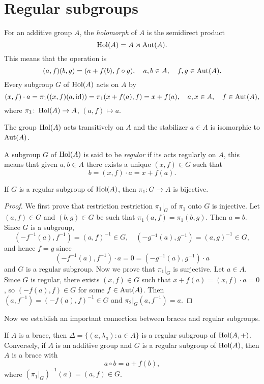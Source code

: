 \chapter{Regular subgroups}

For an additive group $A$, the \emph{holomorph} of $A$ is the semidirect product 
\[
	\operatorname{Hol}(A)=A\rtimes\operatorname{Aut}(A).
\]
This means that the operation is 
\[
	(a,f)(b,g)=(a+f(b),f\circ g),\quad
	a,b\in A,\quad
	f,g\in\operatorname{Aut}(A).
\]
Every subgroup $G$ of $\operatorname{Hol}(A)$ acts on $A$ by 
\[
	(x,f)\cdot a=\pi_1( (x,f)(a,\operatorname{id}) )=\pi_1(x+f(a),f)=x+f(a),\quad
	a,x\in A,\quad 
	f\in\operatorname{Aut}(A),
\]
where $\pi_1\colon \operatorname{Hol}(A)\to A$, $(a,f)\mapsto a$. 

\begin{exercise}
    The group $\operatorname{Hol}(A)$ acts transitively on $A$ 
	and the stabilizer $a\in A$ 
	is isomorphic to $\operatorname{Aut}(A)$. 
\end{exercise}

A subgroup $G$ of $\operatorname{Hol}(A)$ is said to be \emph{regular} 
if its acts regularly on $A$, this means that 
given $a,b\in A$ there exists a unique $(x,f)\in G$ such that
\[
	b=(x,f)\cdot a=x+f(a).
\]

\begin{lemma}
    \label{lem:bijective}
	If $G$ is a regular subgroup of $\operatorname{Hol}(A)$, then $\pi_1\colon G\to A$ is bijective. 
\end{lemma}

\begin{proof}
	We first prove that restriction restriction $\pi_1|_G$ of $\pi_1$ onto $G$ is injective. Let $(a,f)\in G$ and $(b,g)\in G$
	be such that 
	$\pi_1(a,f)=\pi_1(b,g)$. Then $a=b$. Since $G$ is a
	subgroup, 
	\[
		(-f^{-1}(a),f^{-1})=(a,f)^{-1}\in G,
	    \quad
		(-g^{-1}(a),g^{-1})=(a,g)^{-1}\in G,
	\]
	and hence $f=g$ since
	\[
	(-f^{-1}(a),f^{-1})\cdot a=0=(-g^{-1}(a),g^{-1})\cdot a 
	\]
	and $G$ is a regular subgroup.
	Now we prove that $\pi_1|_G$ is surjective. Let $a\in A$. 
	Since $G$ is regular, there exists $(x,f)\in G$ such that $x+f(a)=(x,f)\cdot a=0$, so $(-f(a),f)\in G$ for some $f\in\operatorname{Aut}(A)$. 
	Then $(a,f^{-1})=(-f(a),f)^{-1}\in G$ and $\pi_2|_G(a,f^{-1})=a$. 
\end{proof}

Now we establish an important connection between braces and regular subgroups. 

\begin{theorem}
\label{thm:regular}
	If $A$ is a brace, then $\Delta=\{(a,\lambda_a):a\in A\}$ is a regular subgroup of 
	$\operatorname{Hol}(A,+)$. Conversely, if $A$ is an additive group and 
	$G$ is a regular subgroup of $\operatorname{Hol}(A)$, then $A$ is 
	a brace with 
	\[
		a\circ b=a+f(b),
	\]
	where $(\pi_1|_G)^{-1}(a)=(a,f)\in G$. 
\end{theorem}

